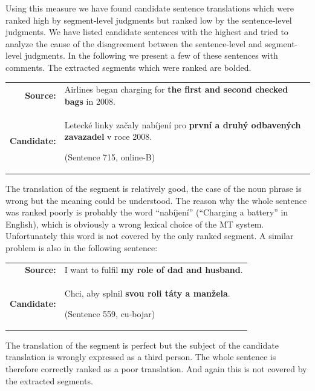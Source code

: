 Using this measure we have found candidate sentence translations which were
ranked high by segment-level judgments but ranked low by the sentence-level
judgments.  We have listed candidate sentences with the highest
 and tried to analyze the cause of the
disagreement between the sentence-level and segment-level judgments. In the
following we present a few of these sentences with comments. The extracted
segments which were ranked are bolded.

\begin{center}
  \begin{tabular}{rp{11cm}}

    \textbf{Source:} & Airlines began charging for \textbf{the first and second
  checked bags} in 2008. \\

    \textbf{Candidate:} & Letecké linky začaly nabíjení pro \textbf{první a
  druhý odbavených zavazadel} v roce 2008.
  
  (Sentence 715, online-B) \\

  \end{tabular}
\end{center}

\noindent The translation of the segment is relatively good, the case of the
noun phrase is wrong but the meaning could be understood. The reason why the
whole sentence was ranked poorly is probably the word ``nabíjení'' (``Charging
a battery'' in English), which is obviously a wrong lexical choice of the MT
system. Unfortunately this word is not covered by the only ranked segment. A
similar problem is also in the following sentence:

\begin{center}
  \begin{tabular}{rp{11cm}}

    \textbf{Source:} & I want to fulfil \textbf{my role of dad and husband}. \\

    \textbf{Candidate:} & Chci, aby splnil \textbf{svou roli táty a manžela}.
    
    (Sentence 559, cu-bojar) \\

  \end{tabular}
\end{center}

\noindent The translation of the segment is perfect but the subject of the
candidate translation is wrongly expressed as a third person. The whole
sentence is therefore correctly ranked as a poor translation. And again this is
not covered by the extracted segments.

